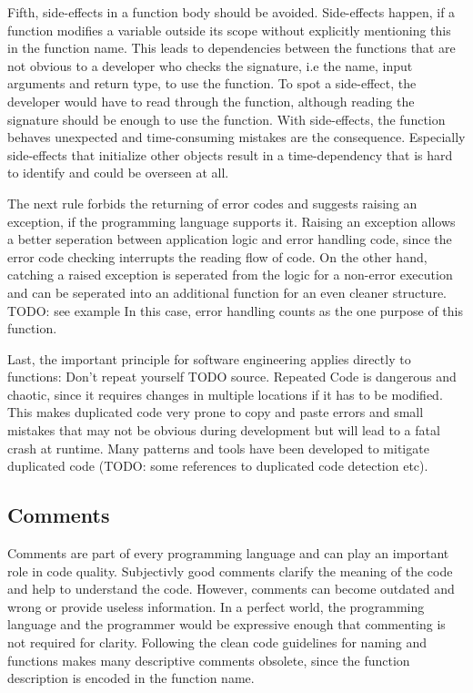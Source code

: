 Fifth, side-effects in a function body should be avoided. Side-effects happen, if a function modifies a variable outside its scope without explicitly mentioning this in the function name. This leads to dependencies between the functions that are not obvious to a developer who checks the signature, i.e the name, input arguments and return type, to use the function. To spot a side-effect, the developer would have to read through the function, although reading the signature should be enough to use the function. With side-effects, the function behaves unexpected and time-consuming mistakes are the consequence. Especially side-effects that initialize other objects result in a time-dependency that is hard to identify and could be overseen at all.

The next rule forbids the returning of error codes and suggests raising an exception, if the programming language supports it. Raising an exception allows a better seperation between application logic and error handling code, since the error code checking interrupts the reading flow of code. On the other hand, catching a raised exception is seperated from the logic for a non-error execution and can be seperated into an additional function for an even cleaner structure. TODO: see example In this case, error handling counts as the one purpose of this function.

Last, the important principle for software engineering applies directly to functions: Don't repeat yourself TODO source. Repeated Code is dangerous and chaotic, since it requires changes in multiple locations if it has to be modified. This makes duplicated code very prone to copy and paste errors and small mistakes that may not be obvious during development but will lead to a fatal crash at runtime. Many patterns and tools have been developed to mitigate duplicated code (TODO: some references to duplicated code detection etc).

\subsection{Comments}
Comments are part of every programming language and can play an important role in code quality. Subjectivly good comments clarify the meaning of the code and help to understand the code. However, comments can become outdated and wrong or provide useless information. In a perfect world, the programming language and the programmer would be expressive enough that commenting is not required for clarity. Following the clean code guidelines for naming and functions makes many descriptive comments obsolete, since the function description is encoded in the function name.

